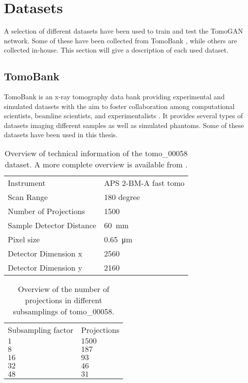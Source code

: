 
\section{Datasets}
\label{sec:method:datasets}
A selection of different datasets have been used to train and test the TomoGAN network. Some of these have been collected from TomoBank \cite{TomoBank}, while others are collected in-house. This section will give a description of each used dataset. 

\subsection{TomoBank}
TomoBank is an x-ray tomography data bank providing experimental and simulated datasets with the aim to foster collaboration among computational scientists, beamline scientists, and experimentalists \cite{TomoBank}. It provides several types of datasets imaging different samples as well as simulated phantoms. Some of these datasets have been used in this thesis.


\begin{table}[htbp]
    \centering
    \caption[Dataset information tomo\_00058]{Overview of technical information of the tomo\_00058 dataset. A more complete overview is available from \cite{datasetglassspheres}. }
    \label{tab:tomo00058}
    \begin{tabular}{ll}
    \hline
    Instrument & APS 2-BM-A fast tomo \\
    Scan Range & 180 degree \\
    Number of Projections & 1500 \\
    Sample Detector Distance & \SI{60}{\milli \meter} \\
    Pixel size & \SI{0.65}{\micro \meter} \\
    Detector Dimension x & 2560 \\
    Detector Dimension y & 2160 \\
    \hline
    \end{tabular}
\end{table}

\begin{table}[htbp]
    \centering
    \caption[Projection subsampling overview]{Overview of the number of projections in different subsamplings of tomo\_00058. }
    \label{tab:projectionsubsampling}
    \begin{tabular}{ll}
    \hline
    Subsampling factor & Projections \\
    \hhline{==}
    $1$ & $1500$ \\
    $8$ & $187$ \\
    $16$ & $93$ \\
    $32$ & $46$ \\
    $48$ & $31$ \\
    \hline
    \end{tabular}
\end{table}

